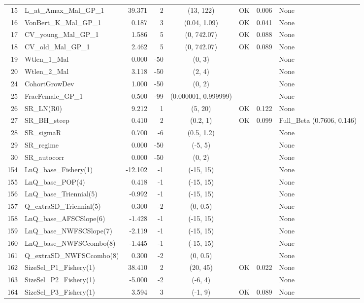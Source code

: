 \documentclass[12pt,]{article}
\begin{document}
\begin{landscape}
\begin{longtable}{rlrrcccl}
  15 & L\_at\_Amax\_Mal\_GP\_1 & 39.371 & 2 & (13, 122) & OK & 0.006 & None \\ 
  16 & VonBert\_K\_Mal\_GP\_1 & 0.187 & 3 & (0.04, 1.09) & OK & 0.041 & None \\ 
  17 & CV\_young\_Mal\_GP\_1 & 1.586 & 5 & (0, 742.07) & OK & 0.088 & None \\ 
  18 & CV\_old\_Mal\_GP\_1 & 2.462 & 5 & (0, 742.07) & OK & 0.089 & None \\ 
  19 & Wtlen\_1\_Mal & 0.000 & -50 & (0, 3) &  &  & None \\ 
  20 & Wtlen\_2\_Mal & 3.118 & -50 & (2, 4) &  &  & None \\ 
  24 & CohortGrowDev & 1.000 & -50 & (0, 2) &  &  & None \\ 
  25 & FracFemale\_GP\_1 & 0.500 & -99 & (0.000001, 0.999999) &  &  & None \\ 
  26 & SR\_LN(R0) & 9.212 & 1 & (5, 20) & OK & 0.122 & None \\ 
  27 & SR\_BH\_steep & 0.410 & 2 & (0.2, 1) & OK & 0.099 & Full\_Beta (0.7606, 0.146) \\ 
  28 & SR\_sigmaR & 0.700 & -6 & (0.5, 1.2) &  &  & None \\ 
  29 & SR\_regime & 0.000 & -50 & (-5, 5) &  &  & None \\ 
  30 & SR\_autocorr & 0.000 & -50 & (0, 2) &  &  & None \\ 
  154 & LnQ\_base\_Fishery(1) & -12.102 & -1 & (-15, 15) &  &  & None \\ 
  155 & LnQ\_base\_POP(4) & 0.418 & -1 & (-15, 15) &  &  & None \\ 
  156 & LnQ\_base\_Triennial(5) & -0.992 & -1 & (-15, 15) &  &  & None \\ 
  157 & Q\_extraSD\_Triennial(5) & 0.300 & -2 & (0, 0.5) &  &  & None \\ 
  158 & LnQ\_base\_AFSCSlope(6) & -1.428 & -1 & (-15, 15) &  &  & None \\ 
  159 & LnQ\_base\_NWFSCSlope(7) & -2.119 & -1 & (-15, 15) &  &  & None \\ 
  160 & LnQ\_base\_NWFSCcombo(8) & -1.445 & -1 & (-15, 15) &  &  & None \\ 
  161 & Q\_extraSD\_NWFSCcombo(8) & 0.300 & -2 & (0, 0.5) &  &  & None \\ 
  162 & SizeSel\_P1\_Fishery(1) & 38.410 & 2 & (20, 45) & OK & 0.022 & None \\ 
  163 & SizeSel\_P2\_Fishery(1) & -5.000 & -2 & (-6, 4) &  &  & None \\ 
  164 & SizeSel\_P3\_Fishery(1) & 3.594 & 3 & (-1, 9) & OK & 0.089 & None \\ 

\end{longtable}
\end{landscape}
\end{document}
